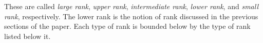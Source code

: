 These are called \emph{large rank}, \emph{upper rank}, \emph{intermediate rank}, \emph{lower rank}, and \emph{small rank}, respectively.
The lower rank is the notion of rank discussed in the previous sections of the paper.
Each type of rank is bounded below by the type of rank listed below it.





